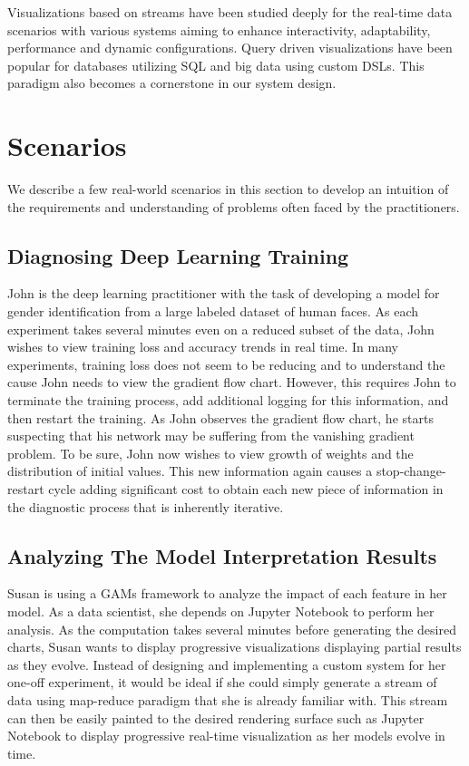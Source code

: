 \documentclass[sigchi]{acmart}
\begin{document}
Visualizations based on streams have been studied deeply for the real-time data scenarios\cite{(Ed.)98datavisualization,Traub2017} with various systems aiming to enhance interactivity, adaptability, performance and dynamic configurations\cite{Logre:2018:MSV:3233739.3229096,ellis2014real, Roberts2007, Few:2006:IDD:1206491}. Query driven visualizations have been popular for databases utilizing SQL and big data using custom DSLs\cite{Stockinger, Babu:2001:CQO:603867.603884, Plale2003}. This paradigm also becomes a cornerstone in our system design.



\section{Scenarios}
We describe a few real-world scenarios in this section to develop an intuition of the requirements and understanding of problems often faced by the practitioners.

\subsection{Diagnosing Deep Learning Training}
John is the deep learning practitioner with the task of developing a model for gender identification from a large labeled dataset of human faces. As each experiment takes several minutes even on a reduced subset of the data, John wishes to view training loss and accuracy trends in real time. In many experiments, training loss does not seem to be reducing and to understand the cause John needs to view the gradient flow chart. However, this requires John to terminate the training process, add additional logging for this information, and then restart the training. As John observes the gradient flow chart, he starts suspecting that his network may be suffering from the vanishing gradient problem. To be sure, John now wishes to view growth of weights and the distribution of initial values. This new information again causes a stop-change-restart cycle adding significant cost to obtain each new piece of information in the diagnostic process that is inherently iterative.

\subsection{Analyzing The Model Interpretation Results}
Susan is using a GAMs framework\cite{Hastie1986} to analyze the impact of each feature in her model. As a data scientist, she depends on Jupyter Notebook to perform her analysis. As the computation takes several minutes before generating the desired charts, Susan wants to display progressive visualizations displaying partial results as they evolve. Instead of designing and implementing a custom system for her one-off experiment, it would be ideal if she could  simply generate a stream of data using map-reduce paradigm that she is already familiar with. This stream can then be easily painted to the desired rendering surface such as Jupyter Notebook to display progressive real-time visualization as her models evolve in time. 
\end{document}
